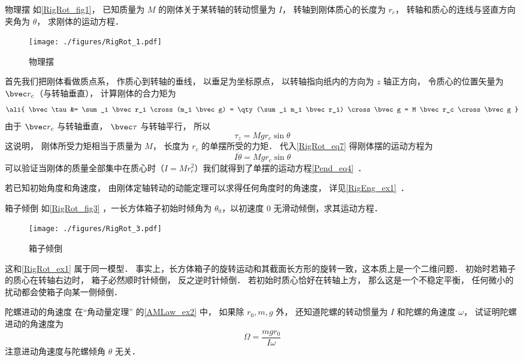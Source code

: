 \begin{example}{物理摆}\label{RigRot_ex1}
如\autoref{RigRot_fig1}， 已知质量为 $M$ 的刚体关于某转轴的转动惯量为 $I$， 转轴到刚体质心的长度为 $r_c$， 转轴和质心的连线与竖直方向夹角为 $\theta$， 求刚体的运动方程．
\begin{figure}[ht]
\centering
\texttt{[image: ./figures/RigRot\_1.pdf]}
\caption{物理摆} \label{RigRot_fig1}
\end{figure}

首先我们把刚体看做质点系， 作质心到转轴的垂线， 以垂足为坐标原点， 以转轴指向纸内的方向为 $z$ 轴正方向， 令质心的位置矢量为 $\bvec r_c$（与转轴垂直）， 计算刚体的合力矩为
\begin{equation}\label{RigRot_eq14}\ali{
\bvec \tau &= \sum_i \bvec r_i \cross (m_i \bvec g)
= \qty(\sum_i m_i \bvec r_i) \cross \bvec g
= M \bvec r_c \cross \bvec g
}\end{equation}
由于 $\bvec r_c$ 与转轴垂直， $\bvec \tau$ 与转轴平行， 所以
\begin{equation}
\tau_z = Mg r_c \sin\theta
\end{equation}
这说明， 刚体所受力矩相当于质量为 $M$， 长度为 $r_c$ 的单摆所受的力矩． 代入\autoref{RigRot_eq7} 得刚体摆的运动方程为
\begin{equation}
I\ddot \theta = Mg r_c \sin\theta
\end{equation}
可以验证当刚体的质量全部集中在质心时（$I = Mr_c^2$）我们就得到了单摆的运动方程\autoref{Pend_eq4}~．

若已知初始角度和角速度， 由刚体定轴转动的动能定理可以求得任何角度时的角速度， 详见\autoref{RigEng_ex1}~．
\end{example}

\begin{example}{箱子倾倒}
如\autoref{RigRot_fig3} ，一长方体箱子初始时倾角为 $\theta_0$，以初速度 0 无滑动倾倒，求其运动方程．
\begin{figure}[ht]
\centering
\texttt{[image: ./figures/RigRot\_3.pdf]}
\caption{箱子倾倒} \label{RigRot_fig3}
\end{figure}
这和\autoref{RigRot_ex1} 属于同一模型． 事实上，长方体箱子的旋转运动和其截面长方形的旋转一致，这本质上是一个二维问题． 初始时若箱子的质心在转轴右边时， 箱子必然顺时针倾倒， 反之逆时针倾倒． 若初始时质心恰好在转轴上方， 那么这是一个不稳定平衡， 任何微小的扰动都会使箱子向某一侧倾倒．
\end{example}

\begin{exercise}{陀螺进动的角速度}\label{RigRot_exe1}
在“角动量定理” 的\autoref{AMLaw_ex2} 中， 如果除 $r_0, m, g$ 外， 还知道陀螺的转动惯量为 $I$ 和陀螺的角速度 $\omega$， 试证明陀螺进动的角速度为
\begin{equation}
\Omega = \frac{mgr_0}{I\omega}
\end{equation}
注意进动角速度与陀螺倾角 $\theta$ 无关．
\end{exercise}

